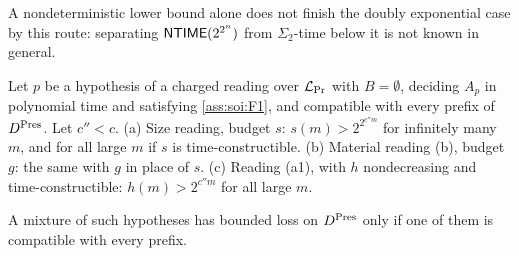 A nondeterministic lower bound alone does not finish the doubly exponential case by this route: separating $\mathsf{NTIME}(2^{2^n})$ from $\Sigma_2$-time below it is not known in general.

\begin{proposition}\label{prop:soi:presburgerCharged}
Let $p$ be a hypothesis of a charged reading over $\mathcal L_{\rm Pr}$ with $B=\emptyset$, deciding $A_p$ in polynomial time and satisfying \cref{ass:soi:F1}, and compatible with every prefix of $D^{\rm Pres}$. Let $c''<c$.
(a) Size reading, budget $s$: $s(m)>2^{2^{c''m}}$ for infinitely many $m$, and for all large $m$ if $s$ is time-constructible.
(b) Material reading (b), budget $g$: the same with $g$ in place of $s$.
(c) Reading (a1), with $h$ nondecreasing and time-constructible: $h(m)>2^{c''m}$ for all large $m$.
\end{proposition}

A mixture of such hypotheses has bounded loss on $D^{\rm Pres}$ only if one of them is compatible with every prefix.

